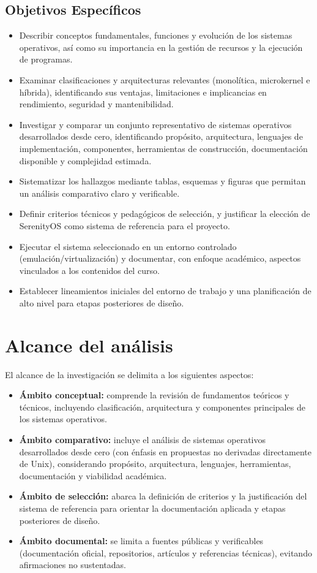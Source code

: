 \subsection{Objetivos Específicos}
\begin{itemize}
    \item Describir conceptos fundamentales, funciones y evolución de los sistemas operativos, así como su importancia en la gestión de recursos y la ejecución de programas.
    \item Examinar clasificaciones y arquitecturas relevantes (monolítica, microkernel e híbrida), identificando sus ventajas, limitaciones e implicancias en rendimiento, seguridad y mantenibilidad.
    \item Investigar y comparar un conjunto representativo de sistemas operativos desarrollados desde cero, identificando propósito, arquitectura, lenguajes de implementación, componentes, herramientas de construcción, documentación disponible y complejidad estimada.
    \item Sistematizar los hallazgos mediante tablas, esquemas y figuras que permitan un análisis comparativo claro y verificable.
    \item Definir criterios técnicos y pedagógicos de selección, y justificar la elección de SerenityOS como sistema de referencia para el proyecto.
    \item Ejecutar el sistema seleccionado en un entorno controlado (emulación/virtualización) y documentar, con enfoque académico, aspectos vinculados a los contenidos del curso.
    \item Establecer lineamientos iniciales del entorno de trabajo y una planificación de alto nivel para etapas posteriores de diseño.
\end{itemize}

\section{Alcance del análisis}
El alcance de la investigación se delimita a los siguientes aspectos:
\begin{itemize}
    \item \textbf{Ámbito conceptual:} comprende la revisión de fundamentos teóricos y técnicos, incluyendo clasificación, arquitectura y componentes principales de los sistemas operativos.
    \item \textbf{Ámbito comparativo:} incluye el análisis de sistemas operativos desarrollados desde cero (con énfasis en propuestas no derivadas directamente de Unix), considerando propósito, arquitectura, lenguajes, herramientas, documentación y viabilidad académica.
    \item \textbf{Ámbito de selección:} abarca la definición de criterios y la justificación del sistema de referencia para orientar la documentación aplicada y etapas posteriores de diseño.
    \item \textbf{Ámbito documental:} se limita a fuentes públicas y verificables (documentación oficial, repositorios, artículos y referencias técnicas), evitando afirmaciones no sustentadas.
\end{itemize}

